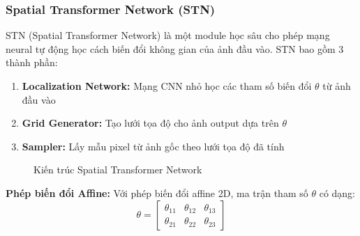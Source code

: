 \subsubsection{Spatial Transformer Network (STN)}
STN (Spatial Transformer Network) \cite{jaderberg2015spatial} là một module học sâu cho phép mạng neural tự động học cách biến đổi không gian của ảnh đầu vào. STN bao gồm 3 thành phần:

\begin{enumerate}
    \item \textbf{Localization Network:} Mạng CNN nhỏ học các tham số biến đổi $\theta$ từ ảnh đầu vào
    \item \textbf{Grid Generator:} Tạo lưới tọa độ cho ảnh output dựa trên $\theta$
    \item \textbf{Sampler:} Lấy mẫu pixel từ ảnh gốc theo lưới tọa độ đã tính
\end{enumerate}

\begin{figure}[!htbp]
    \centering
    \caption{Kiến trúc Spatial Transformer Network}
    \label{fig:stn_arch}
\end{figure}

\textbf{Phép biến đổi Affine:}
Với phép biến đổi affine 2D, ma trận tham số $\theta$ có dạng:
\begin{equation}
    \theta = \begin{bmatrix}
        \theta_{11} & \theta_{12} & \theta_{13} \\
        \theta_{21} & \theta_{22} & \theta_{23}
    \end{bmatrix}
\end{equation}

